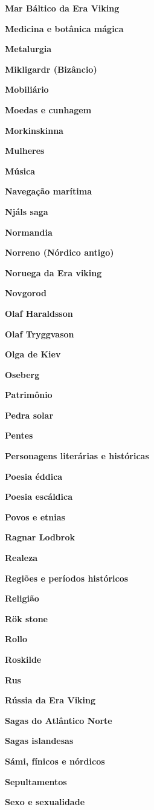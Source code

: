\textbf{Mar Báltico da Era Viking}

\textbf{Medicina e botânica mágica}

\textbf{Metalurgia}

\textbf{Mikligardr (Bizâncio)}

\textbf{Mobiliário}

\textbf{Moedas e cunhagem}

\textbf{Morkinskinna}

\textbf{Mulheres}

\textbf{Música}

\textbf{Navegação marítima}

\textbf{Njáls saga}

\textbf{Normandia}

\textbf{Norreno (Nórdico antigo)}

\textbf{Noruega da Era viking}

\textbf{Novgorod}

\textbf{Olaf Haraldsson}

\textbf{Olaf Tryggvason}

\textbf{Olga de Kiev}

\textbf{Oseberg}

\textbf{Patrimônio}

\textbf{Pedra solar}

\textbf{Pentes}

\textbf{Personagens literárias e históricas}

\textbf{Poesia éddica}

\textbf{Poesia escáldica}

\textbf{Povos e etnias}

\textbf{Ragnar Lodbrok}

\textbf{Realeza}

\textbf{Regiões e períodos históricos}

\textbf{Religião}

\textbf{Rök stone}

\textbf{Rollo}

\textbf{Roskilde}

\textbf{Rus}

\textbf{Rússia da Era Viking}

\textbf{Sagas do Atlântico Norte}

\textbf{Sagas islandesas}

\textbf{Sámi, fínicos e nórdicos}

\textbf{Sepultamentos}

\textbf{Sexo e sexualidade}

